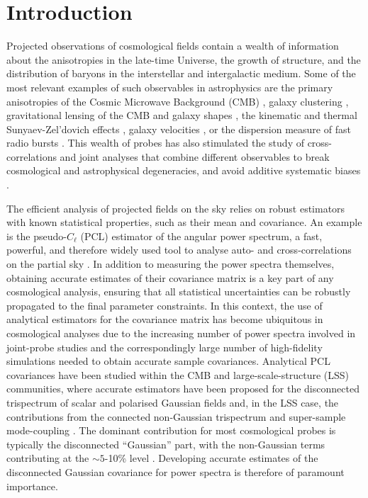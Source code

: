 \documentclass[%
 reprint,
superscriptaddress,
nofootinbib,
 amsmath,amssymb,
 aps,
 prd,
]{revtex4-2}
\begin{document}
\section{Introduction}\label{sec:intro}
    Projected observations of cosmological fields contain a wealth of information about the anisotropies in the late-time Universe, the growth of structure, and the distribution of baryons in the interstellar and intergalactic medium. Some of the most relevant examples of such observables in astrophysics are the primary anisotropies of the Cosmic Microwave Background (CMB) \cite{1807.06209,2503.14452}, galaxy clustering \cite{1912.08209,2309.06443}, gravitational lensing of the CMB \cite{astro-ph/0601594,2304.05202} and galaxy shapes \cite{astro-ph/9912508,2501.07938}, the kinematic and thermal Sunyaev-Zel'dovich effects \cite{astro-ph/9808050,1811.02310,2407.07152,2512.14625}, galaxy velocities \cite{2410.06229,2504.02525,2605.15947}, or the dispersion measure of fast radio bursts \cite{2506.08932,2509.05866,2602.12174,2604.22105}. This wealth of probes has also stimulated the study of cross-correlations and joint analyses that combine different observables to break cosmological and astrophysical degeneracies, and avoid additive systematic biases \cite{2105.12108,2309.03258,2407.04607,2503.24385,2603.04269,2606.28099}.
    
    The efficient analysis of projected fields on the sky relies on robust estimators with known statistical properties, such as their mean and covariance. An example is the pseudo-$C_\ell$ (PCL) estimator of the angular power spectrum, a fast, powerful, and therefore widely used tool to analyse auto- and cross-correlations on the partial sky \cite{astro-ph/0105302,1809.09603}. In addition to measuring the power spectra themselves, obtaining accurate estimates of their covariance matrix is a key part of any cosmological analysis, ensuring that all statistical uncertainties can be robustly propagated to the final parameter constraints. In this context, the use of analytical estimators for the covariance matrix has become ubiquitous in cosmological analyses due to the increasing number of power spectra involved in joint-probe studies and the correspondingly large number of high-fidelity simulations needed to obtain accurate sample covariances. Analytical PCL covariances have been studied within the CMB and large-scale-structure (LSS) communities, where accurate estimators have been proposed for the disconnected trispectrum of scalar and polarised Gaussian fields \citep{astro-ph/0012087,astro-ph/0410394,1906.11765,2010.09717,2204.13721} and, in the LSS case, the contributions from the connected non-Gaussian trispectrum and super-sample mode-coupling \citep{1711.07467}. The dominant contribution for most cosmological probes is typically the disconnected ``Gaussian'' part, with the non-Gaussian terms contributing at the $\sim5$-10\% level \citep{1807.04266}. Developing accurate estimates of the disconnected Gaussian covariance for power spectra is therefore of paramount importance.
\end{document}
